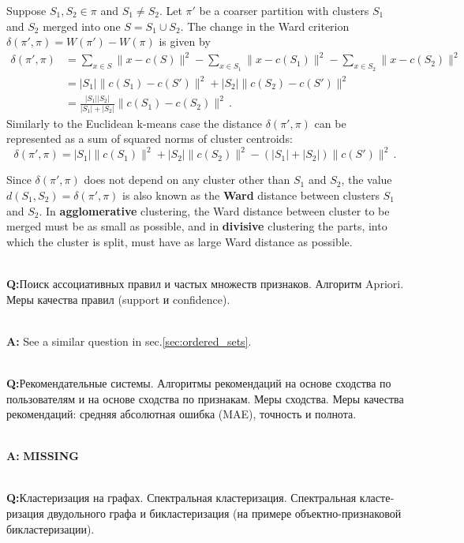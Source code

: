 \documentclass[a4paper]{article}
\newcommand{\rus}[1]{\foreignlanguage{russian}{#1}}
\begin{document}
Suppose $S_1, S_2\in \pi$ and $S_1\neq S_2$. Let $\pi'$ be a coarser partition with
clusters $S_1$ and $S_2$ merged into one $S = S_1\cup S_2$. The change in the Ward
criterion $\delta(\pi',\pi) = W(\pi') - W(\pi)$ is given by
\begin{align*}
    \delta(\pi',\pi)
    &= \sum_{x\in S} \|x - c(S)\|^2 - \sum_{x\in S_1} \|x - c(S_1)\|^2
     - \sum_{x\in S_2} \|x - c(S_2)\|^2\\
    &= |S_1| \|c(S_1) - c(S')\|^2 + |S_2| \|c(S_2) - c(S')\|^2 \\
    &= \frac{|S_1| |S_2|}{|S_1| + |S_2|} \|c(S_1) - c(S_2)\|^2 \,.
\end{align*}
Similarly to the Euclidean k-means case the distance $\delta(\pi',\pi)$ can be represented
as a sum of squared norms of cluster centroids:
$$ \delta(\pi',\pi)
    = |S_1|\|c(S_1)\|^2 + |S_2|\|c(S_2)\|^2
    - (|S_1|+|S_2|)\|c(S')\|^2
    \,. $$

Since $\delta(\pi',\pi)$ does not depend on any cluster other than $S_1$ and $S_2$, the
value $d(S_1, S_2) = \delta(\pi',\pi)$ is also known as the \textbf{Ward} distance between
clusters $S_1$ and $S_2$. In \textbf{agglomerative} clustering, the Ward distance between
cluster to be merged must be as small as possible, and in \textbf{divisive} clustering
the parts, into which the cluster is split, must have as large Ward distance as possible.


\hfill\\\textbf{Q:}\rus{Поиск ассоциативных правил и частых множеств признаков.
Алгоритм Apriori. Меры качества правил (support и confidence).}

\hfill\\\textbf{A:}
See a similar question in sec.\ref{sec:ordered_sets}.

\hfill\\\textbf{Q:}\rus{Рекомендательные системы. Алгоритмы рекомендаций на основе
сходства по пользователям и на основе сходства по признакам. Меры сходства. Меры
качества рекомендаций: средняя абсолютная ошибка (MAE), точность и полнота.}

\hfill\\\textbf{A:} \textbf{MISSING}

\hfill\\\textbf{Q:}\rus{Кластеризация на графах. Спектральная кластеризация. Спектральная
кластеризация двудольного графа и бикластеризация (на примере объектно-признаковой
бикластеризации).}
\end{document}
